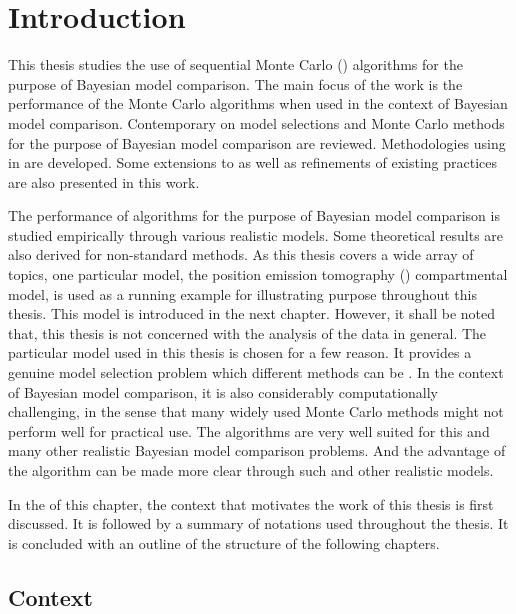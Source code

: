 \chapter{Introduction}
\label{cha:Introduction}

\begin{draftpar}
This thesis studies the use of sequential Monte Carlo (\smc) algorithms for the purpose of Bayesian model comparison. The main focus of the work is the performance of the Monte Carlo algorithms when  used in the context of Bayesian model comparison. Contemporary  on model selections and Monte Carlo methods for the purpose of Bayesian model comparison are reviewed. Methodologies  using \smc in  are developed. Some extensions to as well as refinements of existing \smc practices are also presented in this work.

The performance of \smc algorithms for the purpose of Bayesian model comparison is studied empirically through various realistic models. Some theoretical results are also derived for non-standard methods. As this thesis covers a wide array of topics, one particular model, the position emission tomography (\pet) compartmental model, is used as a running example for illustrating purpose throughout this thesis. This model is introduced in the next chapter. However, it shall be noted that, this thesis is not concerned with the analysis of the \pet data in general. The particular model used in this thesis is chosen for a few reason. It provides a genuine model selection problem  which different methods can be . In the context of Bayesian model comparison, it is also considerably computationally challenging, in the sense that many widely used Monte Carlo methods might not perform well for practical use. The \smc algorithms are very well suited for this and many other realistic Bayesian model comparison problems. And the advantage of the \smc algorithm can be made more clear through such and other realistic models.

In the  of this chapter, the context that motivates the work of this thesis is first discussed. It is followed by a summary of notations used throughout the thesis. It is concluded with an outline of the structure of the following chapters.
\end{draftpar}

\section{Context}
\label{sec:Context}

